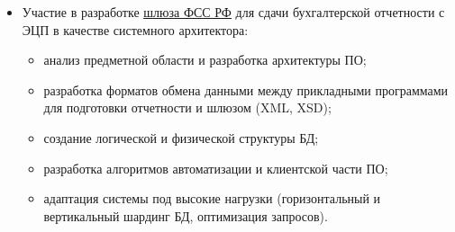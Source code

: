 {\begin{itemize}
\begin{itemize}
  \item адаптация системы под высокие нагрузки (горизонтальный и вертикальный шардинг БД, оптимизация запросов).
  \end{itemize}
\item Участие в разработке \href{http://f4.fss.ru}{\underline{шлюза ФСС РФ}} для сдачи бухгалтерской отчетности с ЭЦП в качестве системного архитектора:
  \begin{itemize}
  \item анализ предметной области и разработка архитектуры ПО;
  \item разработка форматов обмена данными между прикладными программами для подготовки отчетности и шлюзом (XML, XSD);
  \item создание логической и физической структуры БД;
  \item разработка алгоритмов автоматизации и клиентской части ПО;
  \item адаптация системы под высокие нагрузки (горизонтальный и вертикальный шардинг БД, оптимизация запросов).
  \end{itemize}
\end{itemize}}
